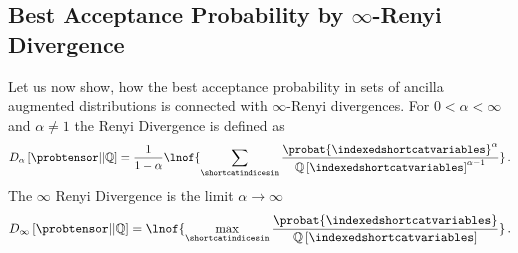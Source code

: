 \subsection{Best Acceptance Probability by $\infty$-Renyi Divergence}

Let us now show, how the best acceptance probability in sets of ancilla augmented distributions is connected with $\infty$-Renyi divergences.
For $0<\alpha<\infty$ and $\alpha\neq 1$ the Renyi Divergence is defined as
\begin{align*}
    D_{\alpha}\left[\probtensor||\mathbb{Q}\right]
    = \frac{1}{1-\alpha} \lnof{\sum_{\shortcatindicesin}
        \frac{\probat{\indexedshortcatvariables}^{\alpha}}{\mathbb{Q}\left[\indexedshortcatvariables\right]^{\alpha-1}}
    } \, .
\end{align*}
The $\infty$ Renyi Divergence is the limit $\alpha\rightarrow\infty$
\begin{align*}
    D_{\infty}\left[\probtensor||\mathbb{Q}\right]
    = \lnof{\max_{\shortcatindicesin}
        \frac{\probat{\indexedshortcatvariables}}{\mathbb{Q}\left[\indexedshortcatvariables\right]}
    } \, .
\end{align*}

